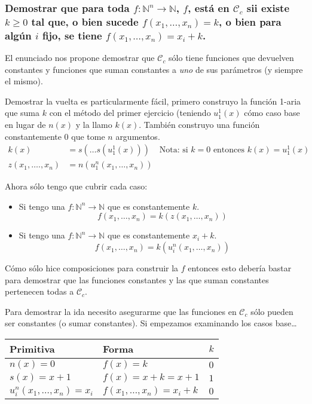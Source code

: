 \documentclass[fleqn, 11pt]{article}
\newcommand{\nat}{\mathbb{N}}
\newcommand{\Ccur}{\mathcal{C}}
\begin{document}
\subsubsection{Demostrar que para toda $f: \nat^n \to \nat$, $f$, está en
$\Ccur_c$ sii existe $k \geq 0$ tal que, o bien sucede $f(x_1, \dots, x_n) =
k$, o bien para algún $i$ fijo, se tiene $f(x_1, \dots, x_n) = x_i + k$.}

El enunciado nos propone demostrar que $\Ccur_c$ sólo tiene funciones que
devuelven constantes y funciones que suman constantes a \emph{uno} de sus
parámetros (y siempre el mismo).

Demostrar la vuelta es particularmente fácil, primero construyo la función
1-aria que suma $k$ con el método del primer ejercicio (teniendo $u^1_1(x)$
cómo caso base en lugar de $n(x)$ y la llamo $k(x)$. También construyo una
función constantemente 0 que tome $n$ argumentos.
\begin{align*}
	k(x)                &= s(\dots s(u^1_1(x)))
	&\text{Nota: si }k = 0 \text{\ entonces } k(x) = u^1_1(x) \\
	z(x_1, \dots., x_n) &= n(u^n_1(x_1, \dots, x_n))
\end{align*}

Ahora sólo tengo que cubrir cada caso:
\begin{itemize}
	\item Si tengo una $f: \nat^n \to \nat$ que es constantemente $k$.
		\[f(x_1, \dots, x_n) = k(z(x_1, \dots, x_n))\]
	\item Si tengo una $f: \nat^n \to \nat$ que es constantemente
		$x_i + k$.
		\[f(x_1, \dots, x_n) = k(u^n_i(x_1, \dots, x_n))\]
\end{itemize}

Cómo sólo hice composiciones para construir la $f$ entonces esto debería bastar
para demostrar que las funciones constantes y las que suman constantes
pertenecen todas a $\Ccur_c$.

Para demostrar la ida necesito asegurarme que las funciones en $\Ccur_c$ sólo
pueden ser constantes (o sumar constantes). Si empezamos examinando los casos
base\dots

\begin{center}
	\begin{tabular}{lll}
		Primitiva  & Forma                  & $k$ \\ \toprule
		$n(x)=0$   & $f(x) = k$             & $0$ \\
		$s(x)=x+1$ & $f(x) = x + k = x + 1$ & $1$ \\
		$u^n_i(x_1, \dots, x_n)=x_i$ & $f(x_1, \dots, x_n) = x_i + k$
		& $0$
	\end{tabular}
\end{center}
\end{document}
